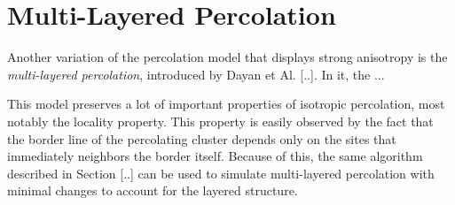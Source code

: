 \section{Multi-Layered Percolation}
\label{sec:mlp}

Another variation of the percolation model that displays strong anisotropy
is the \textit{multi-layered percolation}, introduced by Dayan et Al. [..].
In it, the ...

This model preserves a lot of important properties of isotropic percolation,
most notably the locality property. This property is easily observed by the
fact that the border line of the percolating cluster depends only on the
sites that immediately neighbors the border itself. Because of this, the
same algorithm described in Section [..] can be used to simulate multi-layered
percolation with minimal changes to account for the layered structure.
